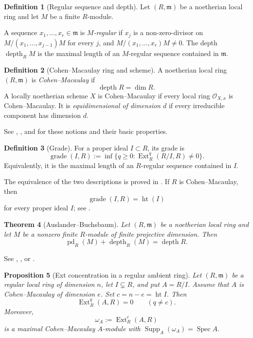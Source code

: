 \documentclass[11pt,a4paper]{article}
\newtheorem{theorem}{Theorem}[section]
\newtheorem{proposition}[theorem]{Proposition}
\theoremstyle{definition}
\newtheorem{definition}[theorem]{Definition}
\theoremstyle{remark}
\newcommand{\OO}{\mathcal O}
\newcommand{\Spec}{\operatorname{Spec}}
\newcommand{\Ext}{\operatorname{Ext}}
\newcommand{\depth}{\operatorname{depth}}
\newcommand{\grade}{\operatorname{grade}}
\newcommand{\height}{\operatorname{ht}}
\newcommand{\pd}{\operatorname{pd}}
\newcommand{\Supp}{\operatorname{Supp}}
\begin{document}
\begin{definition}[Regular sequence and depth]
Let $(R,\mathfrak m)$ be a noetherian local ring and let $M$ be a finite
$R$-module.

A sequence $x_1,\ldots,x_r\in\mathfrak m$ is \emph{$M$-regular} if
$x_j$ is a non-zero-divisor on
$M/(x_1,\ldots,x_{j-1})M$ for every $j$, and
$M/(x_1,\ldots,x_r)M\neq 0$.
The depth $\depth_R M$ is the maximal length of an $M$-regular sequence
contained in $\mathfrak m$.
\end{definition}

\begin{definition}[Cohen--Macaulay ring and scheme]
A noetherian local ring $(R,\mathfrak m)$ is \emph{Cohen--Macaulay} if
\[
  \depth R=\dim R.
\]
A locally noetherian scheme $X$ is Cohen--Macaulay if every local ring
$\OO_{X,x}$ is Cohen--Macaulay.  It is \emph{equidimensional of dimension
$d$} if every irreducible component has dimension $d$.
\end{definition}

See \cite[Chapter III, Section 6]{HartshorneAG},
\cite[Chapter 2]{BrunsHerzog}, and
\cite[Section 17]{Matsumura} for these notions and their basic properties.

\begin{definition}[Grade]
For a proper ideal $I\subset R$, its grade is
\[
  \grade(I,R)
  :=\inf\{q\geq 0:\Ext_R^q(R/I,R)\neq 0\}.
\]
Equivalently, it is the maximal length of an $R$-regular sequence contained
in $I$.
\end{definition}

The equivalence of the two descriptions is proved in
\cite[Theorem 1.2.5]{BrunsHerzog}.  If $R$ is Cohen--Macaulay, then
\begin{equation}\label{eq:grade-height}
  \grade(I,R)=\height(I)
\end{equation}
for every proper ideal $I$; see
\cite[Theorem 17.4]{Matsumura}.

\begin{theorem}[Auslander--Buchsbaum]
\label{thm:AB}
Let $(R,\mathfrak m)$ be a noetherian local ring and let $M$ be a nonzero
finite $R$-module of finite projective dimension.  Then
\[
  \pd_R(M)+\depth_R(M)=\depth R.
\]
\end{theorem}

See \cite[Chapter III, Proposition 6.12A]{HartshorneAG},
\cite[Theorem 1.3.3]{BrunsHerzog}, or
\cite[Theorem 19.1]{Matsumura}.

\begin{proposition}[Ext concentration in a regular ambient ring]
\label{prop:local-ext-concentration}
Let $(R,\mathfrak m)$ be a regular local ring of dimension $n$, let
$I\subsetneq R$, and put $A=R/I$.  Assume that $A$ is Cohen--Macaulay of
dimension $e$.  Set $c=n-e=\height I$.  Then
\begin{equation}\label{eq:local-ext-concentration}
  \Ext_R^q(A,R)=0\qquad(q\neq c).
\end{equation}
Moreover,
\[
  \omega_A:=\Ext_R^c(A,R)
\]
is a maximal Cohen--Macaulay $A$-module with
$\Supp_A(\omega_A)=\Spec A$.
\end{proposition}
\end{document}
